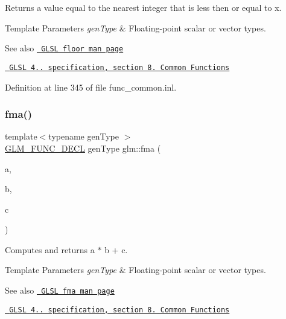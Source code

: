 Returns a value equal to the nearest integer that is less then or equal to x.


\begin{DoxyTemplParams}{Template Parameters}
{\em gen\+Type} & Floating-\/point scalar or vector types.\\
\hline
\end{DoxyTemplParams}
\begin{DoxySeeAlso}{See also}
\href{http://www.opengl.org/sdk/docs/manglsl/xhtml/floor.xml}{\texttt{ G\+L\+SL floor man page}} 

\href{http://www.opengl.org/registry/doc/GLSLangSpec.4.20.8.pdf}{\texttt{ G\+L\+SL 4.. specification, section 8. Common Functions}} 
\end{DoxySeeAlso}


Definition at line 345 of file func\+\_\+common.\+inl.

\mbox{\label{group__core__func__common_gad0f444d4b81cc53c3b6edf5aa25078c2}} 
\subsubsection{\texorpdfstring{fma()}{fma()}}
{\footnotesize\ttfamily template$<$typename gen\+Type $>$ \\
\mbox{\hyperlink{setup_8hpp_ab2d052de21a70539923e9bcbf6e83a51}{G\+L\+M\+\_\+\+F\+U\+N\+C\+\_\+\+D\+E\+CL}} gen\+Type glm\+::fma (\begin{DoxyParamCaption}\item[{gen\+Type const \&}]{a,  }\item[{gen\+Type const \&}]{b,  }\item[{gen\+Type const \&}]{c }\end{DoxyParamCaption})}

Computes and returns a $\ast$ b + c.


\begin{DoxyTemplParams}{Template Parameters}
{\em gen\+Type} & Floating-\/point scalar or vector types.\\
\hline
\end{DoxyTemplParams}
\begin{DoxySeeAlso}{See also}
\href{http://www.opengl.org/sdk/docs/manglsl/xhtml/fma.xml}{\texttt{ G\+L\+SL fma man page}} 

\href{http://www.opengl.org/registry/doc/GLSLangSpec.4.20.8.pdf}{\texttt{ G\+L\+SL 4.. specification, section 8. Common Functions}} 
\end{DoxySeeAlso}


